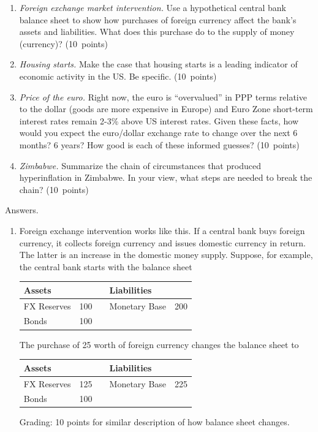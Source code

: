\documentclass[letterpaper,12pt]{article}
\begin{document}
\begin{enumerate}
\begin{enumerate}
\item {\it Foreign exchange market intervention.\/}
Use a hypothetical central bank balance sheet to show how
purchases of foreign currency affect the bank's assets and liabilities. What does this purchase do to the supply of money (currency)? 
(10~points)

\item {\it Housing starts.\/}
Make the case that housing starts is a 
leading indicator of economic activity in the US.  Be specific.  
(10~points)

\item {\it Price of the euro.\/}
Right now, the euro is ``overvalued'' in PPP terms relative to the
dollar (goods are more expensive in Europe) and Euro Zone short-term interest rates remain 2-3\% above US interest rates.
Given these facts, how would you expect the euro/dollar exchange rate to change over the next 6 months?  6 years?
How good is each of these informed guesses?  
(10~points)


\item {\it Zimbabwe.\/}
Summarize the chain of circumstances that produced 
hyperinflation in Zimbabwe.
In your view, what steps are needed to break the chain?  
(10~points)


\end{enumerate}

Answers.
\begin{enumerate}
\item Foreign exchange intervention works like this.  If a central bank buys foreign currency, it collects foreign currency and 
    issues domestic currency in return. 
    The latter is an increase in the domestic money supply.   
    Suppose, for example, the central bank
     starts with the balance sheet
\begin{center}
\begin{tabular}{lrclr}
               Assets  &     &&     Liabilities                     \\  
               \hline 
               FX Reserves &  100 &&     Monetary Base &  200   \\    
               Bonds   & 100 && \\
\end{tabular}
\end{center}
%
The purchase of 25 worth of foreign currency 
changes the balance sheet to
%
\begin{center}
\begin{tabular}{lrclr}
               Assets  &     &&     Liabilities                     \\ 
               \hline 
               FX Reserves &  125 &&     Monetary Base &  225   \\    
               Bonds   & 100 && \\
\end{tabular}
\end{center}
%
Grading:  10 points for similar description of 
how balance sheet changes.
    

\end{enumerate}
\end{enumerate}
\end{document}
